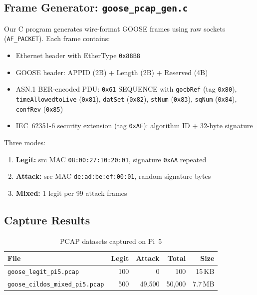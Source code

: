 \documentclass[11pt,a4paper,twocolumn]{article}
\begin{document}
\subsection{Frame Generator: \texttt{goose\_pcap\_gen.c}}

Our C program generates wire-format GOOSE frames using raw sockets (\texttt{AF\_PACKET}). Each frame contains:
\begin{itemize}[leftmargin=1.5em,itemsep=1pt]
\item Ethernet header with EtherType \texttt{0x88B8}
\item GOOSE header: APPID (2B) + Length (2B) + Reserved (4B)
\item ASN.1 BER-encoded PDU: \texttt{0x61} SEQUENCE with \texttt{gocbRef} (tag \texttt{0x80}), \texttt{timeAllowedtoLive} (\texttt{0x81}), \texttt{datSet} (\texttt{0x82}), \texttt{stNum} (\texttt{0x83}), \texttt{sqNum} (\texttt{0x84}), \texttt{confRev} (\texttt{0x85})
\item IEC~62351-6 security extension (tag \texttt{0xAF}): algorithm ID + 32-byte signature
\end{itemize}

Three modes:
\begin{enumerate}[leftmargin=1.5em,itemsep=1pt]
\item \textbf{Legit:} src MAC \texttt{08:00:27:10:20:01}, signature \texttt{0xAA} repeated
\item \textbf{Attack:} src MAC \texttt{de:ad:be:ef:00:01}, random signature bytes
\item \textbf{Mixed:} 1 legit per 99 attack frames
\end{enumerate}

\subsection{Capture Results}

\begin{table}[H]
\centering
\caption{PCAP datasets captured on Pi~5}
\scriptsize
\begin{tabular}{@{}lrrrr@{}}
\toprule
\textbf{File} & \textbf{Legit} & \textbf{Attack} & \textbf{Total} & \textbf{Size} \\
\midrule
\texttt{goose\_legit\_pi5.pcap} & 100 & 0 & 100 & 15\,KB \\
\texttt{goose\_cildos\_mixed\_pi5.pcap} & 500 & 49{,}500 & 50{,}000 & 7.7\,MB \\
\bottomrule
\end{tabular}
\end{table}
\end{document}
